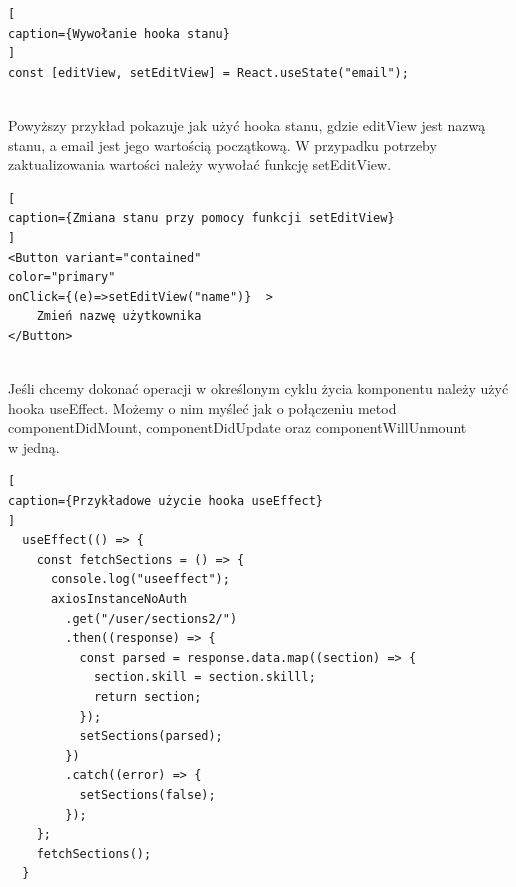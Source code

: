 \documentclass[oneside,polski,logo,indent]{amuthesis}
\begin{document}
\begin{lstlisting}[
caption={Wywołanie hooka stanu}
]
const [editView, setEditView] = React.useState("email");


\end{lstlisting}

Powyższy przykład pokazuje jak użyć hooka stanu, gdzie editView jest nazwą stanu, a email jest jego wartością początkową. W przypadku potrzeby zaktualizowania wartości należy 
wywołać funkcję setEditView.


\begin{lstlisting}[
caption={Zmiana stanu przy pomocy funkcji setEditView}
]
<Button variant="contained" 
color="primary" 
onClick={(e)=>setEditView("name")}  >
	Zmień nazwę użytkownika
</Button>


\end{lstlisting}

Jeśli chcemy dokonać operacji w określonym cyklu życia komponentu należy użyć hooka useEffect. Możemy o nim myśleć jak o połączeniu metod componentDidMount, componentDidUpdate oraz componentWillUnmount \\w jedną.


\begin{lstlisting}[
caption={Przykładowe użycie hooka useEffect}
]
  useEffect(() => {
    const fetchSections = () => {
      console.log("useeffect");
      axiosInstanceNoAuth
        .get("/user/sections2/")
        .then((response) => {
          const parsed = response.data.map((section) => {
            section.skill = section.skilll;
            return section;
          });
          setSections(parsed);
        })
        .catch((error) => {
          setSections(false);
        });
    };
    fetchSections();
  }


\end{lstlisting}
\end{document}
